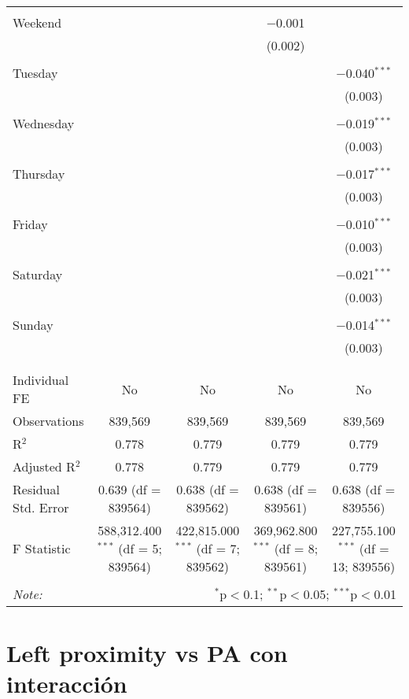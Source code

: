\documentclass[
]{article}
\begin{document}
\begin{table}[!htbp]
{\begin{tabular}{@{\extracolsep{5pt}}lcccc}
  & & & & \\ 
 Weekend &  &  & $-$0.001 &  \\ 
  &  &  & (0.002) &  \\ 
  & & & & \\ 
 Tuesday &  &  &  & $-$0.040$^{***}$ \\ 
  &  &  &  & (0.003) \\ 
  & & & & \\ 
 Wednesday &  &  &  & $-$0.019$^{***}$ \\ 
  &  &  &  & (0.003) \\ 
  & & & & \\ 
 Thursday &  &  &  & $-$0.017$^{***}$ \\ 
  &  &  &  & (0.003) \\ 
  & & & & \\ 
 Friday &  &  &  & $-$0.010$^{***}$ \\ 
  &  &  &  & (0.003) \\ 
  & & & & \\ 
 Saturday &  &  &  & $-$0.021$^{***}$ \\ 
  &  &  &  & (0.003) \\ 
  & & & & \\ 
 Sunday &  &  &  & $-$0.014$^{***}$ \\ 
  &  &  &  & (0.003) \\ 
  & & & & \\ 
\hline \\[-1.8ex] 
Individual FE & No & No & No & No \\ 
Observations & 839,569 & 839,569 & 839,569 & 839,569 \\ 
R$^{2}$ & 0.778 & 0.779 & 0.779 & 0.779 \\ 
Adjusted R$^{2}$ & 0.778 & 0.779 & 0.779 & 0.779 \\ 
Residual Std. Error & 0.639 (df = 839564) & 0.638 (df = 839562) & 0.638 (df = 839561) & 0.638 (df = 839556) \\ 
F Statistic & 588,312.400$^{***}$ (df = 5; 839564) & 422,815.000$^{***}$ (df = 7; 839562) & 369,962.800$^{***}$ (df = 8; 839561) & 227,755.100$^{***}$ (df = 13; 839556) \\ 
\hline 
\hline \\[-1.8ex] 
\textit{Note:}  & \multicolumn{4}{r}{$^{*}$p$<$0.1; $^{**}$p$<$0.05; $^{***}$p$<$0.01} \\ 
\end{tabular}
} 
\end{table} 
\newpage
\section{Left proximity vs PA con interacción}
\end{document}
